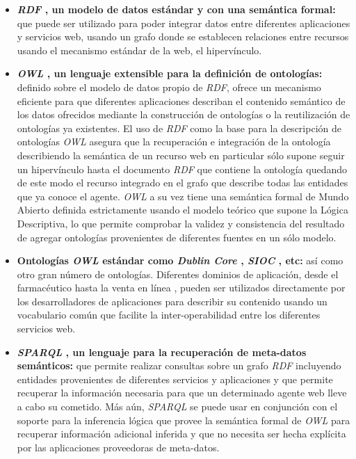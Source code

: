 \begin{itemize}

\item \textbf{\textit{RDF} \cite{rdf}, un modelo de datos est\'andar y con una sem\'antica formal:} que puede ser utilizado para poder integrar datos entre diferentes aplicaciones y servicios web, usando un grafo donde se establecen relaciones entre recursos usando el mecanismo est\'andar de la web, el hiperv\'inculo.

\item \textbf{\textit{OWL} \cite{owl}, un lenguaje extensible para la definici\'on de ontolog\'ias:} definido sobre el modelo de datos propio de {\it RDF}, ofrece un mecanismo eficiente para que diferentes aplicaciones describan el contenido sem\'antico de los datos ofrecidos mediante la construcci\'on de ontolog\'ias o la reutilizaci\'on de ontolog\'ias ya existentes. El uso de {\it RDF} como la base para la descripci\'on de ontolog\'ias {\it OWL} asegura que la recuperaci\'on e integraci\'on de la ontolog\'ia describiendo la sem\'antica de un recurso web en particular s\'olo supone seguir un hiperv\'inculo hasta el documento {\it RDF} que contiene la ontolog\'ia quedando de este modo el recurso integrado en el grafo que describe todas las entidades que ya conoce el agente. {\it OWL} a su vez tiene una sem\'antica formal de Mundo Abierto \cite{owl_semantics} definida estrictamente usando el modelo te\'orico que supone la L\'ogica Descriptiva, lo que permite comprobar la validez y consistencia del resultado de agregar ontolog\'ias provenientes de diferentes fuentes en un s\'olo modelo. 

\item \textbf{Ontolog\'ias \textit{OWL} est\'andar como \textit{Dublin Core} \cite{dublin_core}, \textit{SIOC} \cite{sioc}, etc:} as\'i como otro gran n\'umero de ontolog\'ias. Diferentes dominios de aplicaci\'on, desde el farmac\'eutico \cite{denney2009pharma} hasta la venta en l\'inea \cite{goodrelations}, pueden ser utilizados directamente por los desarrolladores de aplicaciones para describir su contenido usando un vocabulario com\'un que facilite la inter-operabilidad entre los diferentes servicios web.

\item \textbf{\textit{SPARQL} \cite{sparql}, un lenguaje para la recuperaci\'on de meta-datos sem\'anticos:} que permite realizar consultas sobre un grafo {\it RDF} incluyendo entidades provenientes de diferentes servicios y aplicaciones y que permite recuperar la informaci\'on necesaria para que un determinado agente web lleve a cabo su cometido. M\'as a\'un, {\it SPARQL} se puede usar en conjunci\'on con el soporte para la inferencia l\'ogica que provee la sem\'antica formal de {\it OWL} para recuperar informaci\'on adicional inferida y que no necesita ser hecha expl\'icita por las aplicaciones proveedoras de meta-datos.

\end{itemize}

